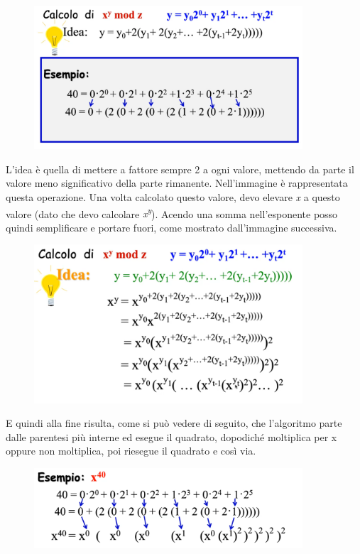 \begin{figure}[htb!]
    \centering
    \includegraphics[width=10cm]{./Images/cap1/1.43.png}
\end{figure} 

L'idea è quella di mettere a fattore sempre 2 a ogni valore, mettendo da parte il valore meno significativo della parte rimanente. Nell'immagine è rappresentata questa operazione. Una volta calcolato questo valore, devo elevare \textit{x} a questo valore (dato che devo calcolare \textit{x\textsuperscript{y}}). Acendo una somma nell'esponente posso quindi semplificare e portare fuori, come mostrato dall'immagine successiva.

\begin{figure}[htb!]
    \centering
    \includegraphics[width=10cm]{./Images/cap1/1.44.png}
\end{figure} 

E quindi alla fine risulta, come si può vedere di seguito, che l'algoritmo parte dalle parentesi più interne ed esegue il quadrato, dopodiché moltiplica per x oppure non moltiplica, poi riesegue il quadrato e così via.
 
\begin{figure}[htb!]
    \centering
    \includegraphics[width=10cm]{./Images/cap1/1.45.png}
\end{figure} 

